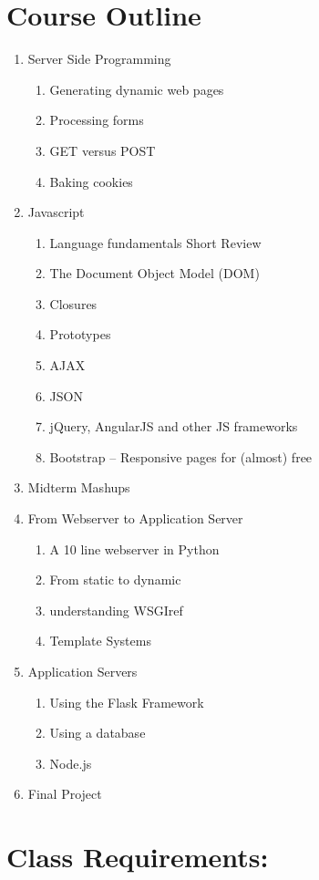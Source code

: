 \documentclass[11pt,twocolumn]{article}
\begin{document}
\section*{Course Outline}
\begin{enumerate}
	\addtolength{\itemsep}{-0.5\baselineskip}
    \item Server Side Programming
	\begin{enumerate}
		\item Generating dynamic web pages
		\item Processing forms
		\item GET versus POST
		\item Baking cookies
	\end{enumerate}
	\item Javascript
	\begin{enumerate}
 		\item Language fundamentals Short Review
		\item The Document Object Model (DOM)
		\item Closures
		\item Prototypes
		\item AJAX
		\item JSON
		\item jQuery, AngularJS and other JS frameworks
        \item Bootstrap -- Responsive pages for (almost) free
	\end{enumerate}
	\item Midterm Mashups
	\item From Webserver to Application Server
	\begin{enumerate}
		\item A 10 line webserver in Python
		\item From static to dynamic
		\item understanding WSGIref
		\item Template Systems
	\end{enumerate}
	\item Application Servers
	\begin{enumerate}
		\item Using the Flask Framework
		\item Using a database
		\item Node.js
	\end{enumerate}
	\item Final Project
\end{enumerate}

\section*{Class Requirements:}
\end{document}
